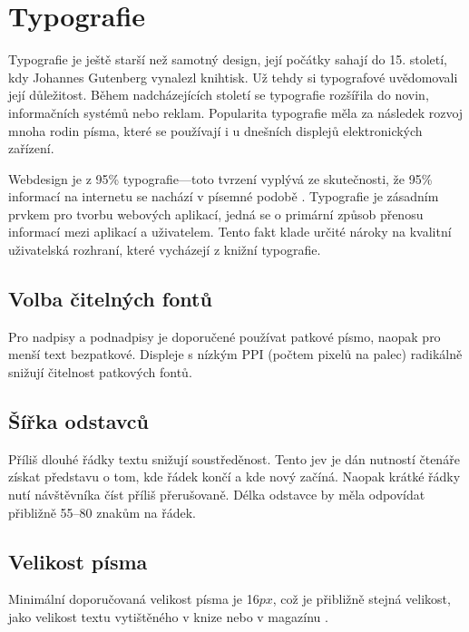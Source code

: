 \section{Typografie}
\label{sec:typografie}

\begin{quote}
     \cite{svalbach}
\end{quote}

\noindent
Typografie je ještě starší než samotný design, její počátky sahají do 15. století, kdy Johannes Gutenberg vynalezl knihtisk. Už tehdy si typografové uvědomovali její důležitost. Během nadcházejících století se typografie rozšířila do novin, informačních systémů nebo reklam. Popularita typografie měla za následek rozvoj mnoha rodin písma, které se používají i u dnešních displejů elektronických zařízení.

Webdesign je z 95\% typografie---toto tvrzení vyplývá ze skutečnosti, že 95\% informací na internetu se nachází v písemné podobě \cite{typography}. Typografie je zásadním prvkem pro tvorbu webových aplikací, jedná se o primární způsob přenosu informací mezi aplikací a uživatelem. Tento fakt klade určité nároky na kvalitní uživatelská rozhraní, které vycházejí z knižní typografie.

\subsection{Volba čitelných fontů}

Pro nadpisy a podnadpisy je doporučené používat patkové písmo, naopak pro menší text bezpatkové. Displeje s nízkým PPI (počtem pixelů na palec) radikálně snižují čitelnost patkových fontů.

\subsection{Šířka odstavců}

Příliš dlouhé řádky textu snižují soustředěnost. Tento jev je dán nutností čtenáře získat představu o tom, kde řádek končí a kde nový začíná. Naopak krátké řádky nutí návštěvníka číst příliš přerušovaně. Délka odstavce by měla odpovídat přibližně 55--80 znakům na řádek.

\subsection{Velikost písma}

Minimální doporučovaná velikost písma je 16$px$, což je přibližně stejná velikost, jako velikost textu vytištěného v knize nebo v magazínu \cite{min-font-size}.

